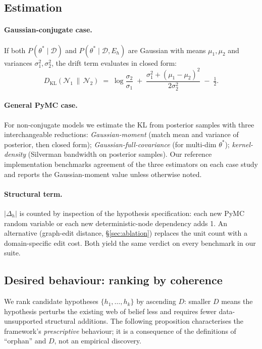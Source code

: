 \documentclass{article}
\begin{document}
\subsection{Estimation}
\label{sec:estimation}

\paragraph{Gaussian-conjugate case.} If both $P(\theta^{*} \mid
\mathcal{D})$ and $P(\theta^{*} \mid \mathcal{D}, E_{h})$ are Gaussian
with means $\mu_{1}, \mu_{2}$ and variances $\sigma_{1}^{2},
\sigma_{2}^{2}$, the drift term evaluates in closed form:
\begin{equation*}
D_{\mathrm{KL}}(\mathcal{N}_{1} \,\|\, \mathcal{N}_{2})
\;=\; \log\frac{\sigma_{2}}{\sigma_{1}}
\;+\; \frac{\sigma_{1}^{2} + (\mu_{1} - \mu_{2})^{2}}{2\sigma_{2}^{2}}
\;-\; \tfrac{1}{2}.
\end{equation*}

\paragraph{General PyMC case.} For non-conjugate models we estimate the
KL from posterior samples with three interchangeable reductions:
\emph{Gaussian-moment} (match mean and variance of posterior, then
closed form); \emph{Gaussian-full-covariance} (for multi-dim
$\theta^{*}$); \emph{kernel-density} (Silverman bandwidth on posterior
samples). Our reference implementation benchmarks agreement of the
three estimators on each case study and reports the
Gaussian-moment value unless otherwise noted.

\paragraph{Structural term.} $|\Delta_{h}|$ is counted by inspection of
the hypothesis specification: each new PyMC random variable or each new
deterministic-node dependency adds 1. An alternative (graph-edit
distance, \S\ref{sec:ablation}) replaces the unit count with a
domain-specific edit cost. Both yield the same verdict on every
benchmark in our suite.

\subsection{Desired behaviour: ranking by coherence}

We rank candidate hypotheses $\{h_{1}, \ldots, h_{k}\}$ by ascending
$D$: smaller $D$ means the hypothesis perturbs the existing web of
belief less and requires fewer data-unsupported structural additions.
The following proposition characterises the framework's
\emph{prescriptive} behaviour; it is a consequence of the definitions
of ``orphan'' and $D$, not an empirical discovery.
\end{document}

